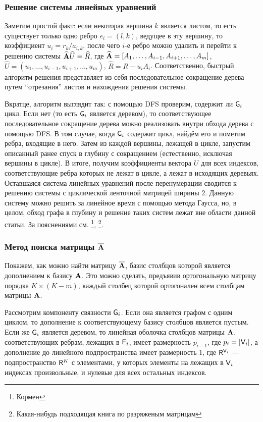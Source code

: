 \documentclass[10pt]{article}
\begin{document}
\subsubsection{Решение системы линейных уравнений}
Заметим простой факт: если некоторая вершина $k$ является листом, то есть существует только одно ребро $e_i = (l, k)$, ведущее в эту вершину, то коэффициент $u_i = r_k / a_{i, k}$, после чего $i$-е ребро можно удалить и перейти к решению системы $\widehat {\mathbf{A}} \widehat U = \widehat R$, где $\widehat {\mathbf{A}} = [A_1, \ldots, A_{i-1}, A_{i+1}, \ldots, A_m]$, $\widehat U = (u_1, \ldots, u_{i - 1}, u_{i + 1}, \ldots, u_m)$, $\widehat R = R - u_i A_i$. Соответственно, быстрый алгоритм решения представляет из себя последовательное сокращение дерева путем ``отрезания'' листов и нахождения решения системы.

Вкратце, алгоритм выглядит так: с помощью DFS проверим, содержит ли $\mathsf{G}_i$ цикл. Если нет (то есть $\mathsf{G}_i$ является деревом), то соответствующее последовательное сокращение дерева можно реализовать внутри обхода дерева с помощью DFS. В том случае, когда $\mathsf{G}_i$ содержит цикл, найдём его и пометим ребра, входящие в него. Затем из каждой вершины, лежащей в цикле, запустим описанный ранее спуск в глубину с сокращением (естественно, исключая вершины в цикле). В итоге, получим коэффициенты вектора $U$ для всех индексов, соответствующие ребра которых не лежат в цикле, а лежат в исходящих деревьях. Оставшаяся система линейных уравнений после перенумерации сводится к решению системы с циклической ленточной матрицей ширины $2$. Данную систему можно решить за линейное время с помощью метода Гаусса, но, в целом, обход графа в глубину и решение таких систем лежат вне области данной статьи. За пояснениями см. \footnote{Кормен}, \footnote{Какая-нибудь подходящая книга по разряженым матрицам}.
\subsubsection{Метод поиска матрицы $\overline {\mathbf{A}}$}
Покажем, как можно найти матрицу $\overline {\mathbf{A}}$, базис столбцов которой является дополнением к базису $\mathbf{A}$. Это можно сделать, предъявив ортогональную матрицу порядка $K \times (K-m)$, каждый столбец которой ортогонален всем столбцам матрицы $\mathbf{A}$.

Рассмотрим компоненту связности $\mathsf{G}_i$. Если она является графом с одним циклом, то дополнение к соответствующему базису столбцов является пустым. Если же $\mathsf{G}_i$ является деревом, то линейная оболочка столбцов матрицы $\mathbf{A}$, соответствующих ребрам, лежащих в $\mathsf{E}_i$, имеет размерность $p_{i-1}$, где $p_i = | \mathsf{V}_i |$, а дополнение до линейного подпространства имеет размерность $1$, где $\mathsf{R}^{\mathsf{V}_i}$ --- подпространство $\mathsf{R}^K$ с элементами, у которых элементы на лежащих в $\mathsf{V}_i$ индексах произвольные, и нулевые для всех остальных индексов.
\end{document}
